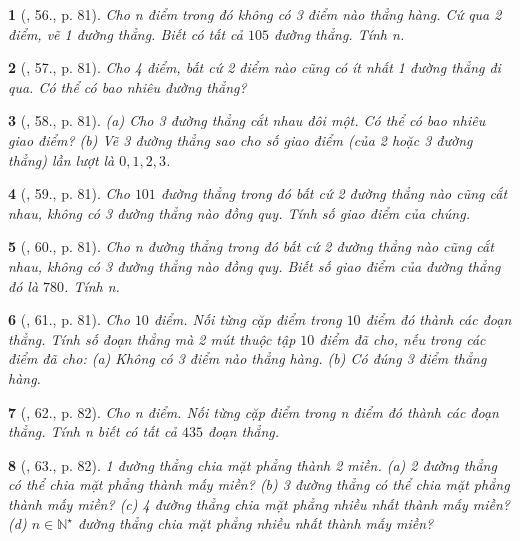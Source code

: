 \documentclass{article}
\newtheorem{baitoan}{}
\begin{document}
\begin{baitoan}[\cite{Binh_Toan_6_tap_2}, 56., p. 81]
	Cho n điểm trong đó không có 3 điểm nào thẳng hàng. Cứ qua 2 điểm, vẽ 1 đường thẳng. Biết có tất cả $105$ đường thẳng. Tính n.
\end{baitoan}

\begin{baitoan}[\cite{Binh_Toan_6_tap_2}, 57., p. 81]
	Cho 4 điểm, bất cứ 2 điểm nào cũng có ít nhất 1 đường thẳng đi qua. Có thể có bao nhiêu đường thẳng?
\end{baitoan}

\begin{baitoan}[\cite{Binh_Toan_6_tap_2}, 58., p. 81]
	(a) Cho 3 đường thẳng cắt nhau đôi một. Có thể có bao nhiêu giao điểm? (b) Vẽ 3 đường thẳng sao cho số giao điểm (của 2 hoặc 3 đường thẳng) lần lượt là $0,1,2,3$.
\end{baitoan}

\begin{baitoan}[\cite{Binh_Toan_6_tap_2}, 59., p. 81]
	Cho $101$ đường thẳng trong đó bất cứ 2 đường thẳng nào cũng cắt nhau, không có 3 đường thẳng nào đồng quy. Tính số giao điểm của chúng.
\end{baitoan}

\begin{baitoan}[\cite{Binh_Toan_6_tap_2}, 60., p. 81]
	Cho n đường thẳng trong đó bất cứ 2 đường thẳng nào cũng cắt nhau, không có 3 đường thẳng nào đồng quy. Biết số giao điểm của đường thẳng đó là $780$. Tính n.
\end{baitoan}

\begin{baitoan}[\cite{Binh_Toan_6_tap_2}, 61., p. 81]
	Cho $10$ điểm. Nối từng cặp điểm trong $10$ điểm đó thành các đoạn thẳng. Tính số đoạn thẳng mà 2 mút thuộc tập $10$ điểm đã cho, nếu trong các điểm đã cho: (a) Không có 3 điểm nào thẳng hàng. (b) Có đúng 3 điểm thẳng hàng.
\end{baitoan}

\begin{baitoan}[\cite{Binh_Toan_6_tap_2}, 62., p. 82]
	Cho n điểm. Nối từng cặp điểm trong n điểm đó thành các đoạn thẳng. Tính n biết có tất cả $435$ đoạn thẳng.
\end{baitoan}

\begin{baitoan}[\cite{Binh_Toan_6_tap_2}, 63., p. 82]
	1 đường thẳng chia mặt phẳng thành 2 miền. (a) 2 đường thẳng có thể chia mặt phẳng thành mấy miền? (b) 3 đường thẳng có thể chia mặt phẳng thành mấy miền? (c) 4 đường thẳng chia mặt phẳng nhiều nhất thành mấy miền? (d) $n\in\mathbb{N}^\star$ đường thẳng chia mặt phẳng nhiều nhất thành mấy miền?
\end{baitoan}
\end{document}

